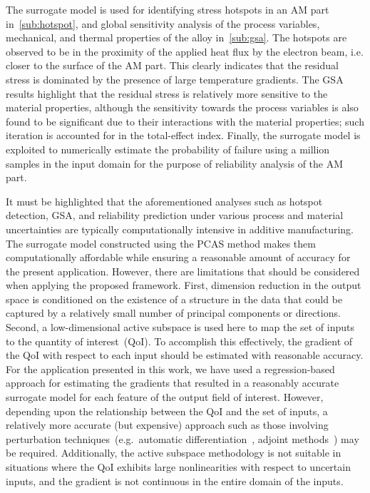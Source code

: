 The surrogate model is used for identifying stress hotspots in an AM part in~\ref{sub:hotspot}, and global sensitivity
analysis of the process variables, mechanical, and thermal properties of the alloy in~\ref{sub:gsa}. 
The hotspots are observed to be in the proximity of the applied heat flux by the electron beam, i.e. 
closer to the surface of the AM part. This clearly indicates that the residual stress is dominated by 
the presence of large temperature gradients. The GSA results 
highlight that the residual stress is relatively more sensitive to the material properties, although the sensitivity
towards the process variables is also found to be significant due to their interactions with the material properties;
such iteration is
accounted for in the total-effect index. Finally, the surrogate model is exploited to numerically estimate the
probability of failure using a million samples in the input domain for the purpose of reliability analysis of the AM part. 

It must be highlighted that the aforementioned
analyses such as hotspot detection, GSA, and reliability prediction under various process and material uncertainties
 are typically computationally intensive in additive manufacturing.
 The surrogate model constructed using the PCAS method makes them computationally
affordable while ensuring a reasonable amount of accuracy for the present application.
 However, there are limitations that should be considered
when applying the proposed framework. First, dimension reduction in the output space is conditioned on the
existence of a structure in the data that could be captured by a relatively small number of principal components or
directions. Second, a low-dimensional active subspace is used here to map the set of inputs to the quantity of
 interest~(QoI).
To accomplish this effectively, the gradient of the QoI with respect to each input should be estimated
with reasonable accuracy. For the application presented in this work, we have used a regression-based approach for 
estimating the gradients that resulted in a reasonably accurate surrogate model for each feature of the output field of interest.
However, depending upon the relationship between the QoI and the set of inputs, a relatively more accurate
(but expensive) approach
such as those involving perturbation techniques~(e.g.~automatic differentiation~\cite{Kiparissides:2009}, adjoint 
methods~\cite{Borzi:2011, Alexanderian:2017}) may be required. Additionally, the active subspace methodology is
not suitable in situations where the QoI exhibits large nonlinearities with respect to uncertain inputs, and the
gradient is not continuous in the entire domain of the inputs.

